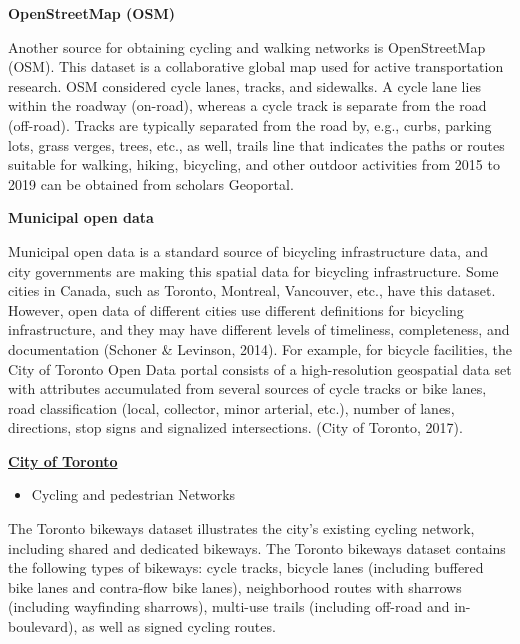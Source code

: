 \documentclass[12pt,twoside]{reedthesis}
\providecommand{\tightlist}{%
  \setlength{\itemsep}{0pt}\setlength{\parskip}{0pt}}
\begin{document}
\textbf{OpenStreetMap (OSM)}

Another source for obtaining cycling and walking networks is OpenStreetMap (OSM). This dataset is a collaborative global map used for active transportation research. OSM considered cycle lanes, tracks, and sidewalks. A cycle lane lies within the roadway (on-road), whereas a cycle track is separate from the road (off-road). Tracks are typically separated from the road by, e.g., curbs, parking lots, grass verges, trees, etc., as well, trails line that indicates the paths or routes suitable for walking, hiking, bicycling, and other outdoor activities from 2015 to 2019 can be obtained from scholars Geoportal.

\textbf{Municipal open data}

Municipal open data is a standard source of bicycling infrastructure data, and city governments are making this spatial data for bicycling infrastructure. Some cities in Canada, such as Toronto, Montreal, Vancouver, etc., have this dataset. However, open data of different cities use different definitions for bicycling infrastructure, and they may have different levels of timeliness, completeness, and documentation (Schoner \& Levinson, 2014). For example, for bicycle facilities, the City of Toronto Open Data portal consists of a high-resolution geospatial data set with attributes accumulated from several sources of cycle tracks or bike lanes, road classification (local, collector, minor arterial, etc.), number of lanes, directions, stop signs and signalized intersections. (City of Toronto, 2017).

\textbf{\href{https://open.toronto.ca/catalogue/?search=point\&sort=score\%20desc}{City of Toronto}}
\begin{itemize}
\tightlist
\item
  Cycling and pedestrian Networks
\end{itemize}
The Toronto bikeways dataset illustrates the city's existing cycling network, including shared and dedicated bikeways. The Toronto bikeways dataset contains the following types of bikeways: cycle tracks, bicycle lanes (including buffered bike lanes and contra-flow bike lanes), neighborhood routes with sharrows (including wayfinding sharrows), multi-use trails (including off-road and in-boulevard), as well as signed cycling routes.
\end{document}
